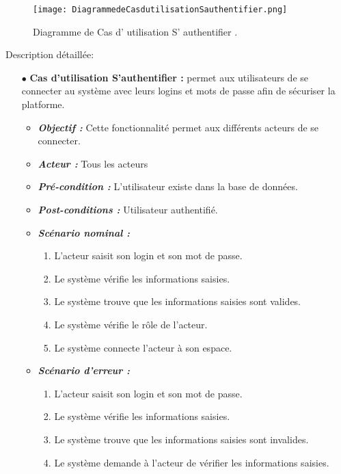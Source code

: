 \begin{figure}[ht]
	\centering
	\texttt{[image: DiagrammedeCasdutilisationSauthentifier.png]}
	\caption{Diagramme de Cas d' utilisation S' authentifier .}
\label{fig:Diagramme de Cas d utilisation S' authentifier }
\end{figure}
\FloatBarrier



{\Large \color{cyan} Description détaillée:}


\begin{itemize}
	
	\item[$\bullet$] \textbf{Cas d’utilisation S’authentifier :} permet aux utilisateurs de se connecter au système avec leurs logins et mots de passe afin de sécuriser la platforme.
	\medskip
	\begin{itemize}
		\item \textit{\textbf{Objectif :}}  Cette fonctionnalité permet aux différents acteurs de se connecter. 
		
		\item \textit{\textbf{Acteur :}} Tous les acteurs
		
		\item \textit{\textbf{Pré-condition  :}} L’utilisateur existe dans la base de données.
		\item \textit{\textbf{Post-conditions   :}} Utilisateur authentifié.
		\item \textit{\textbf{Scénario nominal :}}
		\begin{enumerate}
			\item L’acteur saisit son login et son mot de passe. 
			\item Le système vérifie les informations saisies. 
			\item Le système trouve que les informations saisies sont valides.  
			\item Le système vérifie le rôle de l’acteur.  
			\item Le système connecte l’acteur à son espace.
		\end{enumerate}
		\item \textit{\textbf{Scénario d'erreur :}} 
		\begin{enumerate}
			\item L’acteur saisit son login et son mot de passe. 
			\item Le système vérifie les informations saisies.   
			\item Le système trouve que les informations saisies sont invalides.  
			\item Le système demande à l’acteur de vérifier les informations saisies.
		\end{enumerate}
	\end{itemize}	
	\bigskip
\end{itemize}
\bigskip
